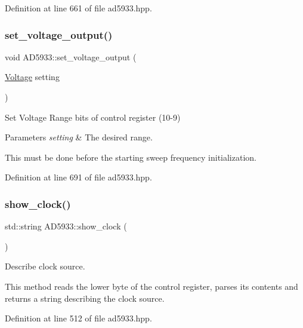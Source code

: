 Definition at line 661 of file ad5933.\+hpp.

\mbox{\label{struct_a_d5933_a2857afff783cc4eb459864ddff7bd151}} 
\subsubsection{\texorpdfstring{set\+\_\+voltage\+\_\+output()}{set\_voltage\_output()}}
{\footnotesize\ttfamily void A\+D5933\+::set\+\_\+voltage\+\_\+output (\begin{DoxyParamCaption}\item[{\mbox{\hyperlink{ad5933_8hpp_ad0295b163fa728ece7beda3d933127de}{Voltage}}}]{setting }\end{DoxyParamCaption})}



Set Voltage Range bits of control register (10-\/9) 


\begin{DoxyParams}{Parameters}
{\em setting} & The desired range.\\
\hline
\end{DoxyParams}
This must be done before the starting sweep frequency initialization. 

Definition at line 691 of file ad5933.\+hpp.

\mbox{\label{struct_a_d5933_afbb03853efb175d6e60ebccefb13af50}} 
\subsubsection{\texorpdfstring{show\+\_\+clock()}{show\_clock()}}
{\footnotesize\ttfamily std\+::string A\+D5933\+::show\+\_\+clock (\begin{DoxyParamCaption}{ }\end{DoxyParamCaption})}



Describe clock source. 

This method reads the lower byte of the control register, parses its contents and returns a string describing the clock source. 

Definition at line 512 of file ad5933.\+hpp.

